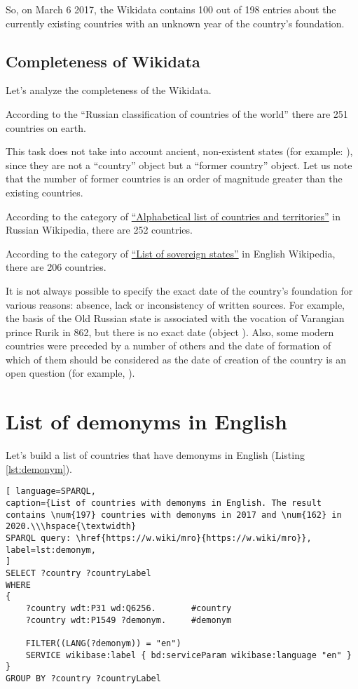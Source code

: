 So, on March 6 2017, the Wikidata contains 100 out of 198 entries about the currently existing countries with an unknown year of the country's foundation.

\subsection{Completeness of Wikidata}

Let's analyze the completeness of the Wikidata.

According to the ``Russian classification of countries of the world'' there are 251 countries on earth.

This task does not take into account ancient, non-existent states (for example: ), since they are not a ``country'' object but a ``former country'' object. Let us note that the number of former countries is an order of magnitude greater than the existing countries.

According to the category of \href{https://w.wiki/dWv}{``Alphabetical list of countries and territories''} in Russian Wikipedia, there are 252 countries.

According to the category of \href{https://en.wikipedia.org/wiki/List_of_sovereign_states}{``List of sovereign states''} in English Wikipedia, there are 206 countries.

It is not always possible to specify the exact date of the country's foundation for various reasons: absence, lack or inconsistency of written sources. For example, the basis of the Old Russian state is associated with the vocation of Varangian prince Rurik in 862, but there is no exact date (object ). Also, some modern countries were preceded by a number of others and the date of formation of which of them should be considered as the date of creation of the country is an open question (for example, ).


\section{List of demonyms in English}

Let's build a list of countries that have demonyms in English (Listing \ref{lst:demonym}).
\begin{lstlisting}[ language=SPARQL, 
caption={List of countries with demonyms in English. The result contains \num{197} countries with demonyms in 2017 and \num{162} in 2020.\\\hspace{\textwidth}
SPARQL query: \href{https://w.wiki/mro}{https://w.wiki/mro}},
label=lst:demonym, 
]
SELECT ?country ?countryLabel 
WHERE
{
	?country wdt:P31 wd:Q6256.       #country
	?country wdt:P1549 ?demonym.     #demonym

	FILTER((LANG(?demonym)) = "en")
	SERVICE wikibase:label { bd:serviceParam wikibase:language "en" }
}
GROUP BY ?country ?countryLabel
\end{lstlisting}


